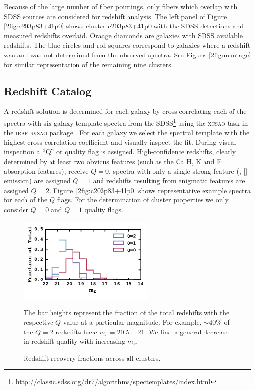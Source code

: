 Because of the large number of fiber pointings, only fibers which overlap with SDSS sources are considered for redshift analysis. The left panel of Figure \ref{2fig:c203p83+41p0} shows cluster c203p83+41p0 with the SDSS detections and measured redshifts overlaid. Orange diamonds are galaxies with SDSS available redshifts. The blue circles and red squares correspond to galaxies where a redshift was and was not determined from the observed spectra. See Figure~\ref{2fig:montage} for similar representation of the remaining nine clusters.

\subsection{Redshift Catalog}\label{2sec:redshift catalog} 
A redshift solution is determined for each galaxy by cross-correlating \citep{Tonry1979} each of the spectra with six galaxy template spectra from the SDSS\footnote{http://classic.sdss.org/dr7/algorithms/spectemplates/index.html} using the \textsc{xcsao} task in the \textsc{iraf} \textsc{rvsao} package \citep{Kurtz1992, Kurtz1998}. For each galaxy we select the spectral template with the highest cross-correlation coefficient and visually inspect the fit. During visual inspection a ``Q'' or quality flag is assigned. High-confidence redshifts, clearly determined by at least two obvious features (such as the Ca H, K and E absorption features), receive $Q=0$, spectra with only a single strong feature (\eg, \hbox{[]} emission) are assigned $Q=1$ and redshifts resulting from enigmatic features are assigned $Q=2$. Figure~\ref{2fig:c203p83+41p0} shows representative example spectra for each of the $Q$ flags. For the determination of cluster properties we only consider $Q=0$ and $Q=1$ quality flags. 

\begin{figure}[t]
	\begin{center}
		\includegraphics[width=0.6\textwidth]{figures2/redshiftHist.pdf}
	\end{center}
	 
	\caption{Redshift recovery fractions across all clusters.} 
	The bar heights represent the fraction of the total redshifts with the respective $Q$ value at a particular magnitude. For example, $\sim 40\%$ of the $Q=2$ redshifts have $m_r = 20.5-21$. We find a general decrease in redshift quality with increasing $m_r$. \label{2fig:redshiftHist} 
\end{figure}

